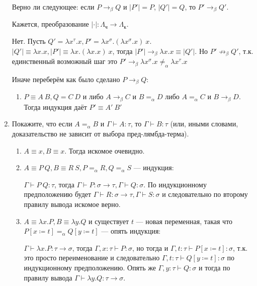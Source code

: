 \begin{enumerate}
            Верно ли следующее: если $P \rightarrow_\beta Q$ и $|P'|=P$, $|Q'|=Q$, то $P'\rightarrow_\beta Q'$.
            \begin{solution}
                  Кажется, преобразование \(| \cdot | : \Lambda_{\mathrm{ч}} \to \Lambda_{\mathrm{к}}\).

                  Нет. Пусть \(Q' = \lambda x^\tau.x, P' = \lambda x^\sigma.(\lambda x^\sigma.x)\ x\). \(|Q'| \equiv \lambda x.x, |P'| \equiv \lambda x.(\lambda x.x)\ x\), тогда \(|P'| \to_\beta \lambda x.x \equiv |Q'|\). Но \(P' \not\to_\beta Q'\), т.к. единственный возможный шаг это \(P' \to_\beta \lambda x^\sigma.x \neq_\alpha \lambda x^\tau.x\)

                  Иначе переберём как было сделано \(P \to_\beta Q\):
                  \begin{enumerate}
                        \item \(P \equiv A\ B, Q = C\ D\) и либо \(A \to_\beta C\) и \(B =_\alpha D\) либо \(A =_\alpha C\) и \(B \to_\beta D\). Тогда индукция даёт \(P' \equiv A'\ B'\)
                  \end{enumerate}
            \end{solution}
      \item Покажите, что если $A =_\alpha B$ и $\Gamma\vdash A:\tau$, то $\Gamma\vdash B:\tau$ (или, иными словами, доказательство не зависит от выбора пред-лямбда-терма).
            \begin{solution}\itemfix
                  \begin{enumerate}
                        \item \(A \equiv x, B \equiv x\). Тогда искомое очевидно.
                        \item \(A \equiv P\ Q, B \equiv R\ S, P =_\alpha R, Q =_\alpha S\) --- индукция:

                              \(\Gamma \vdash P\ Q : \tau\), тогда \(\Gamma \vdash P : \sigma \to \tau, \Gamma \vdash Q : \sigma\). По индукционному предположению будет \(\Gamma \vdash R : \sigma \to \tau, \Gamma \vdash S : \sigma\) и следовательно по второму правилу вывода искомое верно.
                        \item \(A \equiv \lambda x.P, B \equiv \lambda y.Q\) и существует \(t\) --- новая переменная, такая что \(P[x \coloneqq t] =_\alpha Q[y \coloneqq t]\) --- опять индукция:

                              \(\Gamma \vdash \lambda x.P : \tau \to \sigma\), тогда \(\Gamma, x : \tau \vdash P : \sigma\), но тогда и \(\Gamma, t : \tau \vdash P[x \coloneqq t] : \sigma\), т.к. это просто переименование и следовательно \(\Gamma, t : \tau \vdash Q[y \coloneqq t] : \sigma\) по индукционному предположению. Опять же \(\Gamma, y : \tau \vdash Q : \sigma\) и тогда по правилу вывода \(\Gamma \vdash \lambda y.Q : \tau \to \sigma\).
                  \end{enumerate}
            \end{solution}
\end{enumerate}


